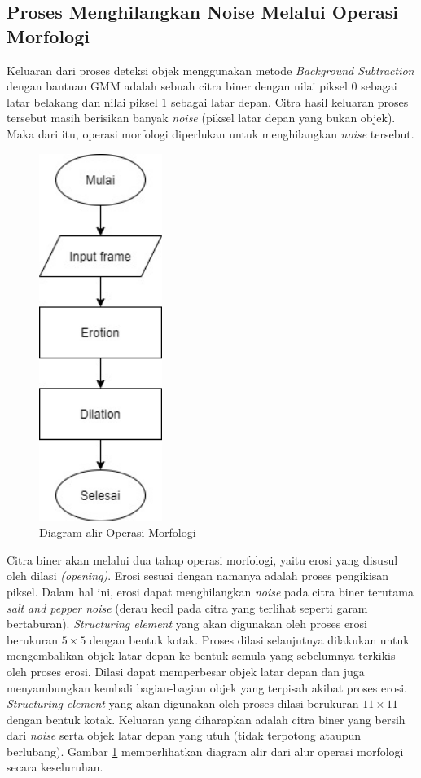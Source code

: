     \subsection{Proses Menghilangkan Noise Melalui Operasi Morfologi}
        Keluaran dari proses deteksi objek menggunakan metode \textit{Background Subtraction} dengan bantuan GMM adalah sebuah citra biner dengan nilai piksel $0$ sebagai latar belakang dan nilai piksel $1$ sebagai latar depan. Citra hasil keluaran proses tersebut masih berisikan banyak \textit{noise} (piksel latar depan yang bukan objek). Maka dari itu, operasi morfologi diperlukan untuk menghilangkan \textit{noise} tersebut.
        \begin{figure}[H]
        \centering
          \singlespacing
          \captionsetup{justification=centering,margin=0.5cm}
          \includegraphics[width=4cm]{image/FlowChart-Morphology.jpg}
          \caption{Diagram alir Operasi Morfologi}
          \label{fig:morphologyflowchart}
        \end{figure}
        
        Citra biner akan melalui dua tahap operasi morfologi, yaitu erosi yang disusul oleh dilasi \textit{(opening)}. Erosi sesuai dengan namanya adalah proses pengikisan piksel. Dalam hal ini, erosi dapat menghilangkan \textit{noise} pada citra biner terutama \textit{salt and pepper noise} (derau kecil pada citra yang terlihat seperti garam bertaburan). \textit{Structuring element} yang akan digunakan oleh proses erosi berukuran $5 \times 5$ dengan bentuk kotak. Proses dilasi selanjutnya dilakukan untuk mengembalikan objek latar depan ke bentuk semula yang sebelumnya terkikis oleh proses erosi. Dilasi dapat memperbesar objek latar depan dan juga menyambungkan kembali bagian-bagian objek yang terpisah akibat proses erosi. \textit{Structuring element} yang akan digunakan oleh proses dilasi berukuran $11 \times 11$ dengan bentuk kotak. Keluaran yang diharapkan adalah citra biner yang bersih dari \textit{noise} serta objek latar depan yang utuh (tidak terpotong ataupun berlubang). Gambar \ref{fig:morphologyflowchart} memperlihatkan diagram alir dari alur operasi morfologi secara keseluruhan.
        
